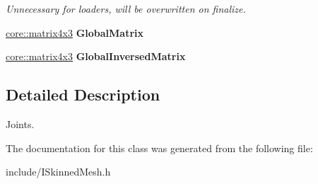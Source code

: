\begin{DoxyCompactItemize}
\begin{DoxyCompactList}\small\item\em Unnecessary for loaders, will be overwritten on finalize. \end{DoxyCompactList}\item 
\hyperlink{classirr_1_1core_1_1matrix4x3}{core\+::matrix4x3} {\bfseries Global\+Matrix}\hypertarget{classirr_1_1scene_1_1ICPUSkinnedMesh_1_1SJoint_a4958db4d327d3ee0a6f2c600197376b3}{}\label{classirr_1_1scene_1_1ICPUSkinnedMesh_1_1SJoint_a4958db4d327d3ee0a6f2c600197376b3}

\item 
\hyperlink{classirr_1_1core_1_1matrix4x3}{core\+::matrix4x3} {\bfseries Global\+Inversed\+Matrix}\hypertarget{classirr_1_1scene_1_1ICPUSkinnedMesh_1_1SJoint_ac183ad4a1e62562ec2f5ac613299e3f3}{}\label{classirr_1_1scene_1_1ICPUSkinnedMesh_1_1SJoint_ac183ad4a1e62562ec2f5ac613299e3f3}

\end{DoxyCompactItemize}


\subsection{Detailed Description}
Joints. 

The documentation for this class was generated from the following file\+:\begin{DoxyCompactItemize}
\item 
include/I\+Skinned\+Mesh.\+h\end{DoxyCompactItemize}
